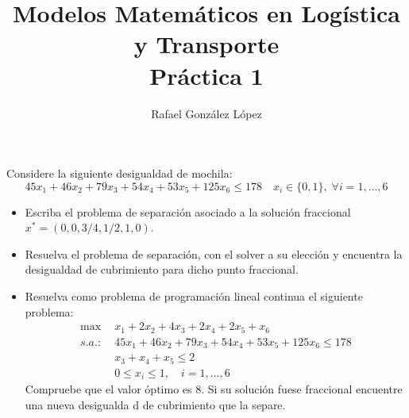 \documentclass[twoside]{article}
\newenvironment{ejercicio}[1]
  {\renewcommand\theejercicioaux{#1}\ejercicioaux\label{ejer:#1}}
  {\endejercicioaux}
\begin{document}
\title{Modelos Matemáticos en Logística y Transporte\\
Práctica 1}
\author{Rafael González López}
\maketitle

\begin{ejercicio}{1}
Considere la siguiente desigualdad de mochila: 
$$
45x_1 + 46x_2 + 79x_3 +54x_4 +53x_5+125x_6 \leq 178 \quad x_i \in \{0,1\}, \; \forall i = 1,\dotsc,6
$$
\begin{itemize}
\item Escriba el problema de separación asociado a la solución fraccional $x^* = (0, 0, 3/4, 1/2, 1, 0)$.
\item Resuelva el problema de separación, con el solver a su elección y encuentra la desigualdad de cubrimiento para dicho punto fraccional. 
\item Resuelva como problema de programación lineal continua el siguiente problema:
\begin{align*}
\max \;& x_1 +2x_2 +4x_3+2x_4+2x_5+x_6\\
s.a.:\;& 45x_1 + 46x_2 + 79x_3 +54x_4 +53x_5+125x_6 \leq 178 \\
&x_3+x_4+x_5\leq 2\\
&0\leq x_i \leq 1,\quad i=1,\dotsc,6
\end{align*}
Compruebe que el valor óptimo es $8$. 
Si su solución fuese fraccional encuentre una nueva desigualda d de cubrimiento que la separe.
\end{itemize}
\end{ejercicio}
\end{document}
